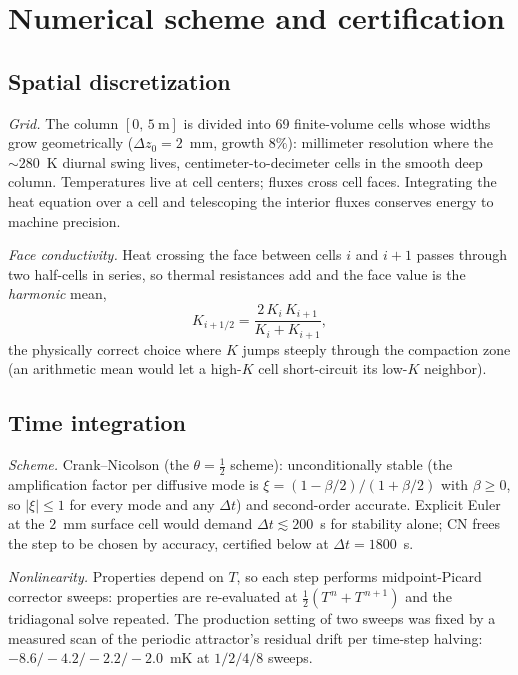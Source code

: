 \documentclass[11pt,a4paper,oneside]{report}
\begin{document}
\chapter{Numerical scheme and certification}\label{app:numerics}

\section{Spatial discretization}
\emph{Grid.} The column $[0,\,5~\mathrm{m}]$ is divided into 69
finite-volume cells whose widths grow geometrically ($\Delta
z_0=2$~mm, growth $8\%$): millimeter resolution where the
${\sim}280$~K diurnal swing lives, centimeter-to-decimeter cells in
the smooth deep column. Temperatures live at cell centers; fluxes
cross cell faces. Integrating the heat equation over a cell and
telescoping the interior fluxes conserves energy to machine
precision.

\emph{Face conductivity.} Heat crossing the face between cells $i$
and $i{+}1$ passes through two half-cells in series, so thermal
resistances add and the face value is the \emph{harmonic} mean,
\begin{equation}
  K_{i+1/2} = \frac{2\,K_i\,K_{i+1}}{K_i+K_{i+1}},
\end{equation}
the physically correct choice where $K$ jumps steeply through the
compaction zone (an arithmetic mean would let a high-$K$ cell
short-circuit its low-$K$ neighbor).

\section{Time integration}
\emph{Scheme.} Crank--Nicolson (the $\theta=\tfrac12$ scheme):
unconditionally stable (the amplification factor per diffusive mode
is $\xi=(1-\beta/2)/(1+\beta/2)$ with $\beta\ge0$, so $|\xi|\le1$ for
every mode and any $\Delta t$) and second-order accurate. Explicit
Euler at the $2$~mm surface cell would demand $\Delta t\lesssim200$~s
for stability alone; CN frees the step to be chosen by accuracy,
certified below at $\Delta t=1800$~s.

\emph{Nonlinearity.} Properties depend on $T$, so each step performs
midpoint-Picard corrector sweeps: properties are re-evaluated at
$\tfrac12(T^{\,n}+T^{\,n+1})$ and the tridiagonal solve repeated. The
production setting of two sweeps was fixed by a measured scan of the
periodic attractor's residual drift per time-step halving:
$-8.6/-4.2/-2.2/-2.0$~mK at $1/2/4/8$ sweeps.
\end{document}
